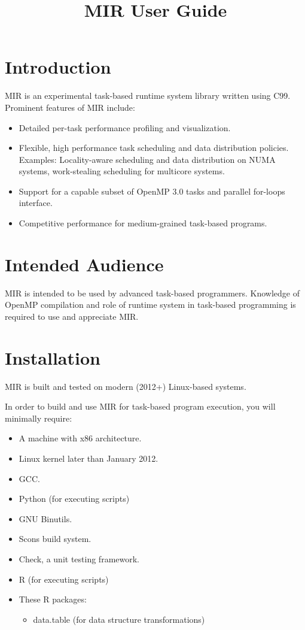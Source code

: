 \documentclass[11pt,a4paper]{article}
\title{MIR User Guide}
\begin{document}
\maketitle

\section{Introduction}\label{introduction}

MIR is an experimental task-based runtime system library written using C99. Prominent features of MIR include:
\begin{itemize}
    \item Detailed per-task performance profiling and visualization.
    \item Flexible, high performance task scheduling and data distribution policies. Examples: Locality-aware scheduling and data distribution on NUMA systems, work-stealing scheduling for multicore systems.
    \item Support for a capable subset of OpenMP 3.0 tasks and parallel for-loops interface.
    \item Competitive performance for medium-grained task-based programs.
\end{itemize}

\section{Intended Audience}\label{intended-audience}

MIR is intended to be used by advanced task-based programmers. Knowledge of OpenMP compilation and role of runtime system in task-based programming is required to use and appreciate MIR.

\section{Installation}\label{installation}

MIR is built and tested on modern (2012+) Linux-based systems.

In order to build and use MIR for task-based program execution, you will minimally require:

\begin{itemize}
  \item A machine with x86 architecture.
  \item Linux kernel later than January 2012.
  \item GCC.
  \item Python (for executing scripts)
  \item GNU Binutils.
  \item Scons build system.
  \item Check, a unit testing framework.
  \item R (for executing scripts)
  \item These R packages:
  \begin{itemize}
      \item data.table (for data structure transformations)
  \end{itemize}
\end{itemize}
\end{document}
